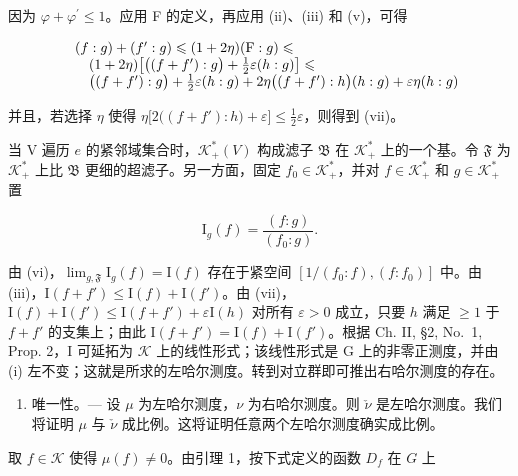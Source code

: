 因为 \(\varphi +\varphi^{\prime}\leqslant 1\)。应用 F 的定义，再应用 (ii)、(iii) 和 (v)，可得

\[
\begin{array}{r l} & {(f: g) + (f ^ {\prime}: g) \leqslant (1 + 2 \eta) (\mathrm{F}: g) \leqslant} \\ & {\quad (1 + 2 \eta) \big [ \big ((f + f ^ {\prime}): g \big) + \frac {1}{2} \varepsilon (h: g) \big ] \leqslant} \\ & {\quad \big ((f + f ^ {\prime}): g \big) + \frac {1}{2} \varepsilon (h: g) + 2 \eta \big ((f + f ^ {\prime}): h \big) (h: g) + \varepsilon \eta (h: g)} \end{array}
\]

并且，若选择 \(\eta\) 使得 \(\eta\big[2\big((f + f'):h\big) + \varepsilon\big] \leqslant \frac{1}{2}\varepsilon\)，则得到 (vii)。

当 V 遍历 \(e\) 的紧邻域集合时，\(\mathcal{K}_{+}^{*}(V)\) 构成滤子 \(\mathfrak{B}\) 在 \(\mathcal{K}_{+}^{*}\) 上的一个基。令 \(\mathfrak{F}\) 为 \(\mathcal{K}_{+}^{*}\) 上比 \(\mathfrak{B}\) 更细的超滤子。另一方面，固定 \(f_{0} \in \mathcal{K}_{+}^{*}\)，并对 \(f \in \mathcal{K}_{+}^{*}\) 和 \(g \in \mathcal{K}_{+}^{*}\) 置

\[
\mathrm{I} _ {g} (f) = \frac {(f : g)}{(f _ {0} : g)}.
\]

由 (vi)，\(\lim_{g,\mathfrak{F}}\mathrm{I}_g(f) = \mathrm{I}(f)\) 存在于紧空间 \([1 / (f_0:f),(f:f_0)]\) 中。由 (iii)，\(\mathrm{I}(f + f')\leqslant \mathrm{I}(f) + \mathrm{I}(f')\)。由 (vii)，\(\mathrm{I}(f) + \mathrm{I}(f')\leqslant \mathrm{I}(f + f') + \varepsilon \mathrm{I}(h)\) 对所有 \(\varepsilon >0\) 成立，只要 \(h\) 满足 \(\geqslant 1\) 于 \(f + f'\) 的支集上；由此 \(\mathrm{I}(f + f') = \mathrm{I}(f) + \mathrm{I}(f')\)。根据 Ch. II, §2, No.~1, Prop. 2，I 可延拓为 \(\mathcal{K}\) 上的线性形式；该线性形式是 G 上的非零正测度，并由 (i) 左不变；这就是所求的左哈尔测度。转到对立群即可推出右哈尔测度的存在。

\begin{enumerate}
\def\labelenumi{\Alph{enumi})}
\setcounter{enumi}{1}
\tightlist
\item
  唯一性。--- 设 \(\mu\) 为左哈尔测度，\(\nu\) 为右哈尔测度。则 \(\check{\nu}\) 是左哈尔测度。我们将证明 \(\mu\) 与 \(\check{\nu}\) 成比例。这将证明任意两个左哈尔测度确实成比例。
\end{enumerate}

取 \(f \in \mathcal{K}\) 使得 \(\mu(f) \neq 0\)。由引理 1，按下式定义的函数 \(D_f\) 在 \(G\) 上

